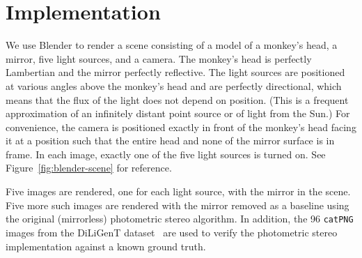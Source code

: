 \section{Implementation}\label{sec:implementation}
We use Blender to render a scene consisting of a model of a monkey's head, a
mirror, five light sources, and a camera. The monkey's head is perfectly
Lambertian and the mirror perfectly reflective. The light sources are
positioned at various angles above the monkey's head and are perfectly
directional, which means that the flux of the light does not depend on
position. (This is a frequent approximation of an infinitely distant point
source or of light from the Sun.) For convenience, the camera is positioned
exactly in front of the monkey's head facing it at a position such that the
entire head and none of the mirror surface is in frame. In each image, exactly
one of the five light sources is turned on. See Figure~\ref{fig:blender-scene}
for reference.

Five images are rendered, one for each light source, with the mirror in the
scene. Five more such images are rendered with the mirror removed as a baseline
using the original (mirrorless) photometric stereo algorithm. In addition, the
96 \texttt{catPNG} images from the DiLiGenT dataset~\cite{shi} are used to
verify the photometric stereo implementation against a known ground truth.

